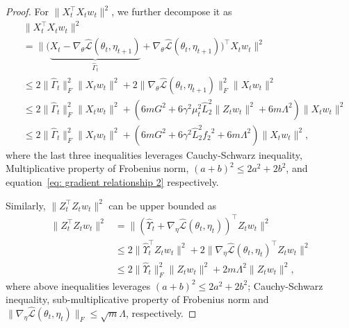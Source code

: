 \documentclass[twoside]{article} %
\def\eqref#1{equation~\ref{#1}}
\theoremstyle{plain}
\theoremstyle{definition}
\theoremstyle{remark}
\newcommand{\HGamma}{\hat{\Gamma}}
\newcommand{\HUpsilon}{\hat{\Upsilon}}
\newcommand{\hL}{\hat{L}}
\newcommand{\fhL}{\hat{\mathcal{L}}}
\begin{document}
\begin{proof}
For $\|{{X}_t^{\top}X_t{w}_t}\|^2$, we further decompose it as
\begin{align}
    &\|{{X}_t^{\top}X_t{w}_t}\|^2 \nonumber\\
    &= \|{\big(\underbrace{{X}_t-\nabla_{\theta}\fhL(\theta_t, \eta_{t+1})}_{\hat{\Gamma}_{t}}+\nabla_{\theta}\fhL(\theta_t, \eta_{t+1})\big)^{\top}X_t{w}_t\|^2}\nonumber\\
    &\leq  2\|\HGamma_{t}\|^2_F\|X_tw_t \|^2 + 2\|\nabla_{\theta}\fhL(\theta_t, \eta_{t+1})\|_F^2 \|X_tw_t\|^2\nonumber\\
    & \leq 2\|\HGamma_{t}\|^2_F\|X_tw_t \|^2 + (6mG^2+6\gamma^2\mu_t^2\hL_2^2\|Z_tw_t\|^2+6m\Lambda^2)\|X_tw_t\|^2\nonumber\\
    &\leq2\|\HGamma_{t}\|^2_F\|X_tw_t \|^2 + (6mG^2+6\gamma^2\hL_2^2{f_2}^2+6m\Lambda^2)\|X_tw_t\|^2,
    \label{eq: upper bound MGDA pre-conditioning}
\end{align}
where the last three inequalities leverages Cauchy-Schwarz inequality, Multiplicative property of Frobenius norm, $(a+b)^2\leq 2a^2+2b^2$, and \eqref{eq: gradient relationship 2} respectively. 

Similarly, $\|{Z}_t^{\top}Z_tw_t\|^2$ can be upper bounded as
\begin{align}
    \|{Z}_t^{\top}Z_tw_t\|^2&=\|({\HUpsilon}_t+\nabla_{\eta}\fhL(\theta_t,\eta_t))^{\top}Z_tw_t\|^2\nonumber\\
    &\leq 2\|{\HUpsilon}_t^{\top}Z_tw_t\|^2+2\|\nabla_{\eta}\fhL(\theta_t,\eta_t)^{\top}Z_tw_t\|^2\nonumber\\
    &\leq 2\| \HUpsilon_t\|^2_F\|Z_tw_t\|^2+2m\Lambda^2\|Z_tw_t\|^2,
    \label{eq: upper bound MGDA pre-conditioning 2}
\end{align}
where above inequalities leverages $(a+b)^2\leq 2a^2+2b^2$; Cauchy-Schwarz inequality, sub-multiplicative property of Frobenius norm and $\|\nabla_{\eta}\fhL(\theta_t,\eta_t)\|_F\leq \sqrt{m}\Lambda$, respectively.


\end{proof}
\end{document}
